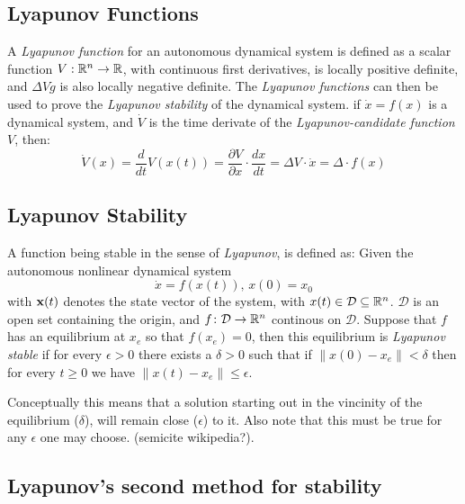 \subsection{Lyapunov Functions}

A \textit{Lyapunov function} for an autonomous dynamical system is defined as a
scalar function \(V: \mathbb{R}^n \rightarrow \mathbb{R}\), with continuous first derivatives,
is locally positive definite, and \(\Delta V \dot g\) is also locally negative
definite. The \textit{Lyapunov functions} can then be used to prove the
\textit{Lyapunov stability} of the dynamical system. if \(\dot{x} = f(x)\) is a
dynamical system, and \(\dot{V}\) is the time derivate of the
\textit{Lyapunov-candidate function} \(V\), then:
\[
  \dot{V}(x) = \frac{d}{dt}V(x(t)) = \frac{\partial V}{\partial x} \cdot
  \frac{dx}{dt} = \Delta V \cdot \dot{x} = \Delta \cdot f(x)
\]

\subsection{Lyapunov Stability}

A function being stable in the sense of \textit{Lyapunov}, is defined as: Given
the autonomous nonlinear dynamical system
\[
  \dot{x} = f(x(t)), \, x(0) = x_0
\]
with \(\mathbf{x}(t)\) denotes the state vector of the system, with \(x(t) \in
\mathcal{D} \subseteq \mathbb{R}^n\). \(\mathcal{D}\) is an open set containing the
origin, and \(f \colon \mathcal{D} \rightarrow \mathbb{R}^n\) continous on
\(\mathcal{D}\). Suppose that \(f\) has an equilibrium at \(x_e\) so that
\(f(x_e) = 0\), then this equilibrium is \textit{Lyapunov stable} if for every
\(\epsilon > 0\) there exists a \(\delta > 0\) such that if \(\left \lVert x(0)
  - x_e \right \rVert < \delta\) then for every \(t \geq 0\) we have \( \left
  \lVert x(t) - x_e \right \rVert \leq \epsilon\).

Conceptually this means that a solution starting out in the vincinity of the
equilibrium (\(\delta\)), will remain close (\(\epsilon\)) to it. Also note that
this must be true for any \(\epsilon\) one may choose. (semicite wikipedia?).

\subsection{Lyapunov's second method for stability}

